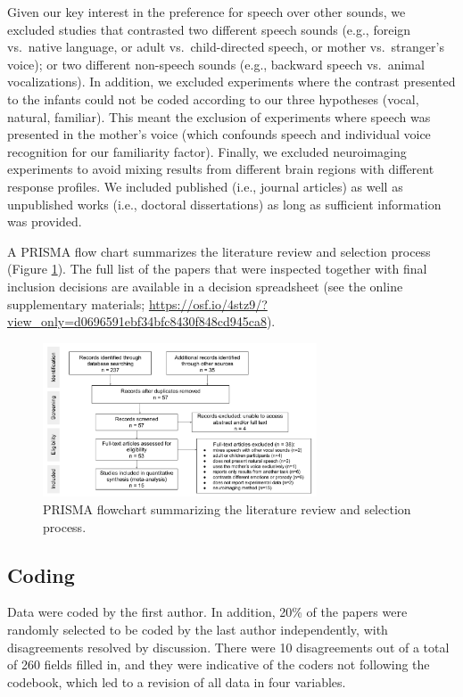 \documentclass[
  man,mask,floatsintext]{apa6}
\begin{document}
Given our key interest in the preference for speech over other sounds, we excluded studies that contrasted two different speech sounds (e.g., foreign vs.~native language, or adult vs.~child-directed speech, or mother vs.~stranger's voice); or two different non-speech sounds (e.g., backward speech vs.~animal vocalizations). In addition, we excluded experiments where the contrast presented to the infants could not be coded according to our three hypotheses (vocal, natural, familiar). This meant the exclusion of experiments where speech was presented in the mother's voice (which confounds speech and individual voice recognition for our familiarity factor). Finally, we excluded neuroimaging experiments to avoid mixing results from different brain regions with different response profiles. We included published (i.e., journal articles) as well as unpublished works (i.e., doctoral dissertations) as long as sufficient information was provided.

A PRISMA flow chart summarizes the literature review and selection process (Figure \ref{fig:prisma}). The full list of the papers that were inspected together with final inclusion decisions are available in a decision spreadsheet (see the online supplementary materials; \url{https://osf.io/4stz9/?view_only=d0696591ebf34bfc8430f848cd945ca8}).

\begin{figure}
\includegraphics[width=3.2in]{figures_intro/PRISMA} \caption{PRISMA flowchart summarizing the literature review and selection process.}\label{fig:prisma}
\end{figure}

\hypertarget{coding}{%
\subsection{Coding}\label{coding}}

Data were coded by the first author. In addition, 20\% of the papers were randomly selected to be coded by the last author independently, with disagreements resolved by discussion. There were 10 disagreements out of a total of 260 fields filled in, and they were indicative of the coders not following the codebook, which led to a revision of all data in four variables.
\end{document}
